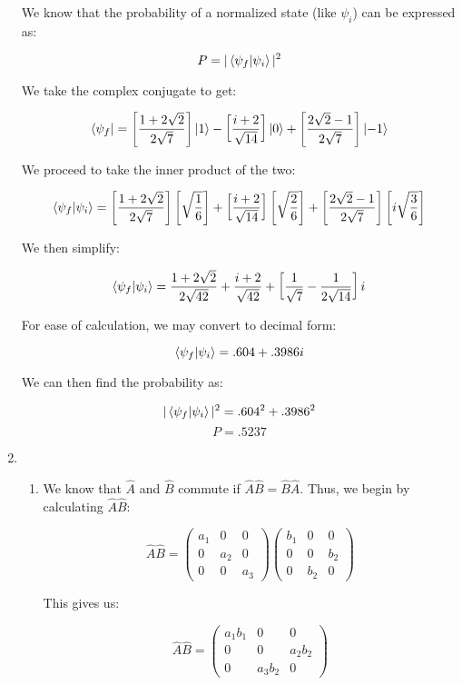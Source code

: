 \begin{enumerate}
    We know that the probability of a normalized state (like $\psi_i$) can be expressed as:

    $$P=|\bra{\psi_f}\ket{\psi_i}|^2$$

    We take the complex conjugate to get:

    $$\bra{\psi_f}=\left[\frac{1+2\sqrt{2}}{2\sqrt{7}}\right]\ket{1}-\left[\frac{i+2}{\sqrt{14}}\right]\ket{0}+\left[\frac{2\sqrt{2}-1}{2\sqrt{7}}\right]\ket{-1}$$

    We proceed to take the inner product of the two:

    $$\bra{\psi_f}\ket{\psi_i}=\left[ \frac{1+2\sqrt{2}}{2\sqrt{7}} \right]\left[ \sqrt{\frac{1}{6}} \right]+\left[ \frac{i+2}{\sqrt{14}} \right]\left[ \sqrt{\frac{2}{6}} \right]+\left[ \frac{2\sqrt{2}-1}{2\sqrt{7}} \right]\left[ i\sqrt{\frac{3}{6}} \right]$$

    We then simplify:

    $$\bra{\psi_f}\ket{\psi_i}=\frac{1+2\sqrt{2}}{2\sqrt{42}}+\frac{i+2}{\sqrt{42}}+\left[ \frac{1}{\sqrt{7}}-\frac{1}{2\sqrt{14}} \right]i$$
    
    For ease of calculation, we may convert to decimal form:

    $$\bra{\psi_f}\ket{\psi_i}=.604+.3986i$$

    We can then find the probability as:

    $$|\bra{\psi_f}\ket{\psi_i}|^2=.604^2+.3986^2$$
    $$\boxed{P=.5237}$$

  \item

    \begin{enumerate}

      \item We know that $\hat{A}$ and $\hat{B}$ commute if $\hat{A}\hat{B}=\hat{B}\hat{A}$. Thus, we begin by calculating $\hat{A}\hat{B}$:

        $$\hat{A}\hat{B}=\left( \begin{matrix} a_1 & 0 & 0\\ 0 & a_2 & 0\\ 0 & 0 & a_3\end{matrix} \right)\left( \begin{matrix} b_1 & 0 & 0\\ 0 & 0 & b_2\\ 0 & b_2 & 0\end{matrix} \right)$$

        This gives us:

        $$\hat{A}\hat{B}=\left( \begin{matrix} a_1b_1 & 0 & 0\\ 0 & 0 & a_2b_2\\ 0 & a_3b_2 & 0\end{matrix} \right)$$


\end{enumerate}
\end{enumerate}
